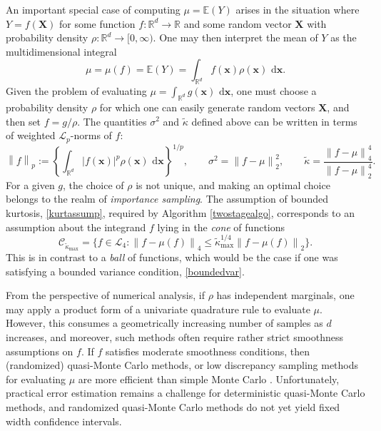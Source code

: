 \documentclass[graybox]{svmult}
\newcommand\reals{\mathbb{R}}
\newcommand\e{\mathbb{E}}
\newcommand{\vx}{\boldsymbol{x}}
\newcommand{\vX}{\boldsymbol{X}}
\newcommand{\rd}{\,\mathrm{d}}
\newcommand{\abs}[1]{\left|#1\right|}
\newcommand{\dif}{\rd}
\newcommand{\tkappa}{\tilde{\kappa}}
\newcommand{\cc}{\mathcal{C}}
\newcommand{\cl}{\mathcal{L}}
\def\abs#1{\ensuremath{\left \lvert #1 \right \rvert}}
\newcommand{\norm}[2][{}]{\ensuremath{\left \lVert #2 \right \rVert}_{#1}}
\begin{document}
An important special case of computing $\mu=\e(Y)$ arises in the situation where $Y=f(\vX)$ for some function $f: \reals^d \to \reals$ and some random vector $\vX$ with probability density $\rho: \reals^d \to [0,\infty)$.  One may then interpret the mean of $Y$ as the multidimensional integral 
\begin{equation} \label{muintegral}
\mu=\mu(f)=\e(Y) = \int_{\reals^d} f(\vx) \rho(\vx) \, \dif \vx.
\end{equation}
Given the problem of evaluating $\mu=\int_{\reals^d} g(\vx) \, \dif \vx$, one must choose a probability density $\rho$ for which one can easily generate random vectors $\vX$, and then set $f = g/\rho$.  The quantities $\sigma^2$ and $\tkappa$ defined above can be written in terms of weighted $\cl_p$-norms of $f$:
\begin{equation} \label{Lpnormdef}
\norm[p]{f} :=\left\{\int_{\reals^d} \abs{f(\vx)}^p \rho(\vx) \, \dif \vx\right\}^{1/p}, \qquad
\sigma^2 = \norm[2]{f-\mu}^2, \qquad \tkappa = \frac{\norm[4]{f-\mu}^4}{\norm[2]{f-\mu}^4}.
\end{equation}
For a given $g$, the choice of $\rho$ is not unique, and making an optimal choice belongs to the realm of \emph{importance sampling}. The assumption of bounded kurtosis, \eqref{kurtassump}, required by Algorithm \ref{twostagealgo}, corresponds to an assumption about the integrand $f$ lying in the \emph{cone} of functions
\begin{equation} \label{conedef}
\cc_{\tkappa_{\max}} = \{ f \in \cl_4 : \norm[4]{f-\mu(f)} \le \tkappa_{\max}^{1/4} \norm[2]{f-\mu(f)} \}.
\end{equation}
This is in contrast to a \emph{ball} of functions, which would be the case if one was satisfying a bounded variance condition, \eqref{boundedvar}.

From the perspective of numerical analysis, if $\rho$ has independent marginals, one may apply a product form of a univariate quadrature rule to evaluate $\mu$.  However, this consumes a geometrically increasing number of samples as $d$ increases, and moreover, such methods often require rather strict smoothness assumptions on $f$.  If $f$ satisfies moderate smoothness conditions, then (randomized) quasi-Monte Carlo methods, or low discrepancy sampling methods for evaluating $\mu$ are more efficient than simple Monte Carlo \citep{Nie92,SloJoe94,Lem09a,DicPil10a}.  Unfortunately, practical error estimation remains a challenge for deterministic quasi-Monte Carlo methods, and randomized quasi-Monte Carlo methods do not yet yield fixed width confidence intervals.
\end{document}
